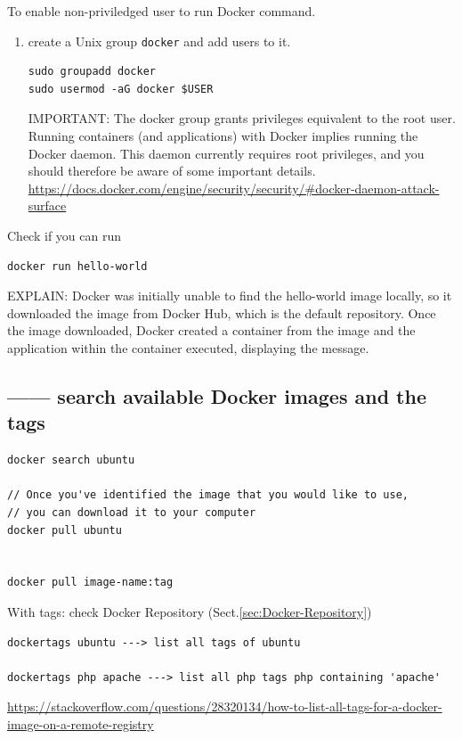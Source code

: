  
To enable non-priviledged user to run Docker command. 
\begin{enumerate}
  \item create a Unix group \verb!docker! and add users to it.
  
 \begin{verbatim}
sudo groupadd docker
sudo usermod -aG docker $USER
 \end{verbatim}
 
  IMPORTANT: The docker group grants privileges equivalent to the root user.
  Running containers (and applications) with Docker implies running the Docker
  daemon. This daemon currently requires root privileges, and you should
  therefore be aware of some important details. 
  \url{https://docs.docker.com/engine/security/security/#docker-daemon-attack-surface}
\end{enumerate}


Check if you can run
\begin{verbatim}
docker run hello-world
\end{verbatim}

EXPLAIN: Docker was initially unable to find the hello-world image locally, so it
downloaded the image from Docker Hub, which is the default repository. Once the
image downloaded, Docker created a container from the image and the application
within the container executed, displaying the message.

\subsection{------ search available Docker images and the tags}

\begin{verbatim}
docker search ubuntu

// Once you've identified the image that you would like to use, 
// you can download it to your computer
docker pull ubuntu


docker pull image-name:tag
\end{verbatim}

With tags: check Docker Repository (Sect.\ref{sec:Docker-Repository})

\begin{verbatim}
dockertags ubuntu ---> list all tags of ubuntu

dockertags php apache ---> list all php tags php containing 'apache'
\end{verbatim}
\url{https://stackoverflow.com/questions/28320134/how-to-list-all-tags-for-a-docker-image-on-a-remote-registry}


